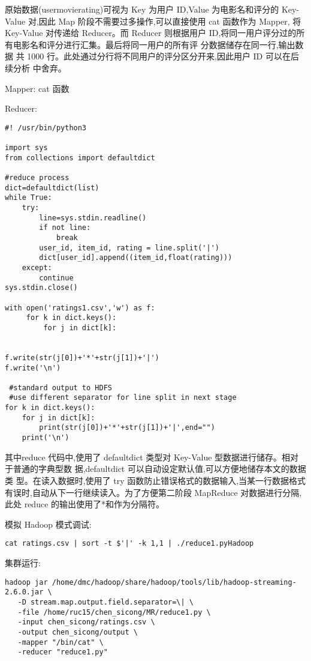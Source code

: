原始数据(user\textbar{}movie\textbar{}rating)可视为 Key 为用户 ID,Value
为电影名和评分的 Key-Value 对,因此 Map 阶段不需要过多操作,可以直接使用
cat 函数作为 Mapper, 将 Key-Value 对传递给 Reducer。而 Reducer
则根据用户 ID,将同一用户评分过的所
有电影名和评分进行汇集。最后将同一用户的所有评
分数据储存在同一行,输出数据 共 1000
行。此处通过分行将不同用户的评分区分开来,因此用户 ID 可以在后续分析
中舍弃。

Mapper: cat 函数

Reducer:

\begin{lstlisting}
#! /usr/bin/python3

import sys
from collections import defaultdict

#reduce process
dict=defaultdict(list)
while True:
    try:
        line=sys.stdin.readline()
        if not line:
            break
        user_id, item_id, rating = line.split('|')
        dict[user_id].append((item_id,float(rating)))
    except:
        continue
sys.stdin.close()

with open('ratings1.csv','w') as f:
     for k in dict.keys():
         for j in dict[k]:


f.write(str(j[0])+'*'+str(j[1])+'|')
f.write('\n')

 #standard output to HDFS
 #use different separator for line split in next stage
for k in dict.keys():
    for j in dict[k]:
        print(str(j[0])+'*'+str(j[1])+'|',end="")
    print('\n')
\end{lstlisting}

其中reduce 代码中,使用了 defaultdict 类型对 Key-Value
型数据进行储存。相对于普通的字典型数 据,defaultdict
可以自动设定默认值,可以方便地储存本文的数据类 型。在读入数据时,使用了
try
函数防止错误格式的数据输入,当某一行数据格式有误时,自动从下一行继续读入。为了方便第二阶段
MapReduce 对数据进行分隔,此处 reduce
的输出使用了*和\textbar{}作为分隔符。

模拟 Hadoop 模式调试:

\begin{lstlisting}
cat ratings.csv | sort -t $'|' -k 1,1 | ./reduce1.pyHadoop
\end{lstlisting}

集群运行:

\begin{lstlisting}
hadoop jar /home/dmc/hadoop/share/hadoop/tools/lib/hadoop-streaming-2.6.0.jar \
   -D stream.map.output.field.separator=\| \
   -file /home/ruc15/chen_sicong/MR/reduce1.py \
   -input chen_sicong/ratings.csv \
   -output chen_sicong/output \
   -mapper "/bin/cat" \
   -reducer "reduce1.py"
\end{lstlisting}

